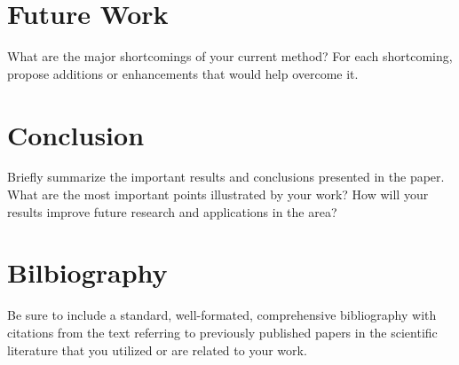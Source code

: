 \documentclass[conference,draft]{IEEEtran}
\begin{document}
\section{Future Work}

\scriptsize{
What are the major shortcomings of your current method? For each shortcoming,
propose additions or enhancements that would help overcome it. 
}\normalsize

\section{Conclusion}

\scriptsize{
Briefly summarize the important results and conclusions presented in the paper.
What are the most important points illustrated by your work? How will your
results improve future research and applications in the area? 
}\normalsize

\section{Bilbiography}

\scriptsize{
Be sure to include a standard, well-formated, comprehensive bibliography with
citations from the text referring to previously published papers in the
scientific literature that you utilized or are related to your work.
}\normalsize

{}

\end{document}
